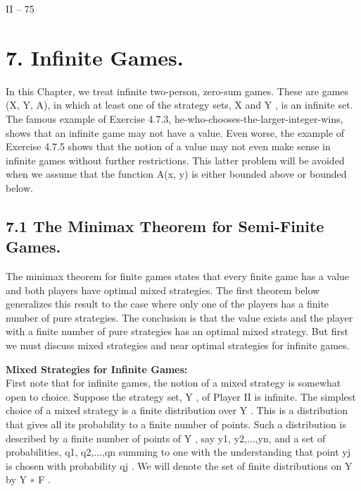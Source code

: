 \documentclass[]{report}
\begin{document}
II – 75

\section{7. Infinite Games.}
In this Chapter, we treat infinite two-person, zero-sum games. These are games
(X, Y, A), in which at least one of the strategy sets, X and Y , is an infinite set. The
famous example of Exercise 4.7.3, he-who-chooses-the-larger-integer-wins, shows that an
infinite game may not have a value. Even worse, the example of Exercise 4.7.5 shows
that the notion of a value may not even make sense in infinite games without further
restrictions. This latter problem will be avoided when we assume that the function A(x, y)
is either bounded above or bounded below.

\subsection{7.1 The Minimax Theorem for Semi-Finite Games.} The minimax theorem for
finite games states that every finite game has a value and both players have optimal mixed
strategies. The first theorem below generalizes this result to the case where only one of
the players has a finite number of pure strategies. The conclusion is that the value exists
and the player with a finite number of pure strategies has an optimal mixed strategy. But
first we must discuss mixed strategies and near optimal strategies for infinite games.

\noindent \textbf{Mixed Strategies for Infinite Games:}\\ First note that for infinite games, the notion
of a mixed strategy is somewhat open to choice. Suppose the strategy set, Y , of Player
II is infinite. The simplest choice of a mixed strategy is a finite distribution over Y .
This is a distribution that gives all its probability to a finite number of points. Such a
distribution is described by a finite number of points of Y , say y1, y2,...,yn, and a set of
probabilities, q1, q2,...,qn summing to one with the understanding that point yj is chosen
with probability qj . We will denote the set of finite distributions on Y by Y ∗
F .
\end{document}
